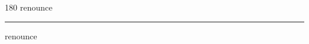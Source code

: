 
\begin{frame}
\begin{center}
\begin{turn}{180}
{\fontsize{2.5cm}{1em}\selectfont renounce}
\end{turn}
\vspace{1em}\par  
\hrule
\vspace{1em}\par  
{\fontsize{2.5cm}{1em}\selectfont renounce}
\end{center}
\end{frame}
